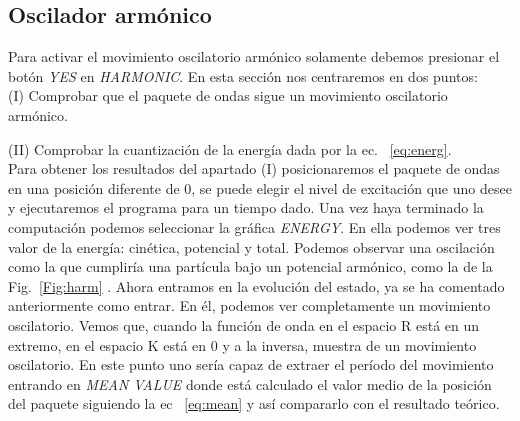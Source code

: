 \documentclass[12pt]{article}
\begin{document}
\subsection{Oscilador arm\'onico}

Para activar el movimiento oscilatorio arm\'onico solamente debemos presionar el bot\'on \textit{YES} en \textit{HARMONIC}. En esta secci\'on nos centraremos en dos puntos:
\\

(I) Comprobar que el paquete de ondas sigue un movimiento oscilatorio arm\'onico.

(II) Comprobar la cuantizaci\'on de la energ\'ia dada por la ec.  ~\eqref{eq:energ}.
\\

Para obtener los resultados del apartado (I) posicionaremos el paquete de ondas en una posici\'on diferente de 0, se puede elegir el nivel de excitaci\'on que uno desee y ejecutaremos el programa para un tiempo dado. Una vez haya terminado la computaci\'on podemos seleccionar la gr\'afica\textit{ ENERGY}. En ella podemos ver tres valor de la energ\'ia: cin\'etica, potencial y total. Podemos observar una oscilaci\'on como la que cumplir\'ia una part\'icula bajo un potencial arm\'onico, como la de la Fig.~\ref{Fig:harm} . Ahora entramos en la evoluci\'on del estado, ya se ha comentado anteriormente como entrar. En \'el, podemos ver completamente un movimiento oscilatorio. Vemos que, cuando la funci\'on de onda en el espacio R est\'a en un extremo, en el espacio K est\'a en 0 y a la inversa, muestra de un movimiento oscilatorio. En este punto uno ser\'ia capaz de extraer el per\'iodo del movimiento entrando en \textit{MEAN VALUE} donde est\'a calculado el valor medio de la posici\'on del paquete siguiendo la ec ~\eqref{eq:mean} y as\'i compararlo con el resultado te\'orico.
\linebreak
\end{document}
